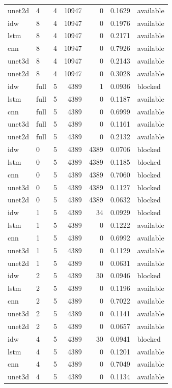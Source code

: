 \begin{tabular}{llrrrrl}
unet2d & 4 & 4 & 10947 & 0 & 0.1629 & available \\
idw & 8 & 4 & 10947 & 0 & 0.1976 & available \\
lstm & 8 & 4 & 10947 & 0 & 0.2171 & available \\
cnn & 8 & 4 & 10947 & 0 & 0.7926 & available \\
unet3d & 8 & 4 & 10947 & 0 & 0.2143 & available \\
unet2d & 8 & 4 & 10947 & 0 & 0.3028 & available \\
idw & full & 5 & 4389 & 1 & 0.0936 & blocked \\
lstm & full & 5 & 4389 & 0 & 0.1187 & available \\
cnn & full & 5 & 4389 & 0 & 0.6999 & available \\
unet3d & full & 5 & 4389 & 0 & 0.1161 & available \\
unet2d & full & 5 & 4389 & 0 & 0.2132 & available \\
idw & 0 & 5 & 4389 & 4389 & 0.0706 & blocked \\
lstm & 0 & 5 & 4389 & 4389 & 0.1185 & blocked \\
cnn & 0 & 5 & 4389 & 4389 & 0.7060 & blocked \\
unet3d & 0 & 5 & 4389 & 4389 & 0.1127 & blocked \\
unet2d & 0 & 5 & 4389 & 4389 & 0.0632 & blocked \\
idw & 1 & 5 & 4389 & 34 & 0.0929 & blocked \\
lstm & 1 & 5 & 4389 & 0 & 0.1222 & available \\
cnn & 1 & 5 & 4389 & 0 & 0.6992 & available \\
unet3d & 1 & 5 & 4389 & 0 & 0.1129 & available \\
unet2d & 1 & 5 & 4389 & 0 & 0.0631 & available \\
idw & 2 & 5 & 4389 & 30 & 0.0946 & blocked \\
lstm & 2 & 5 & 4389 & 0 & 0.1196 & available \\
cnn & 2 & 5 & 4389 & 0 & 0.7022 & available \\
unet3d & 2 & 5 & 4389 & 0 & 0.1141 & available \\
unet2d & 2 & 5 & 4389 & 0 & 0.0657 & available \\
idw & 4 & 5 & 4389 & 30 & 0.0941 & blocked \\
lstm & 4 & 5 & 4389 & 0 & 0.1201 & available \\
cnn & 4 & 5 & 4389 & 0 & 0.7049 & available \\
unet3d & 4 & 5 & 4389 & 0 & 0.1134 & available \\

\end{tabular}
